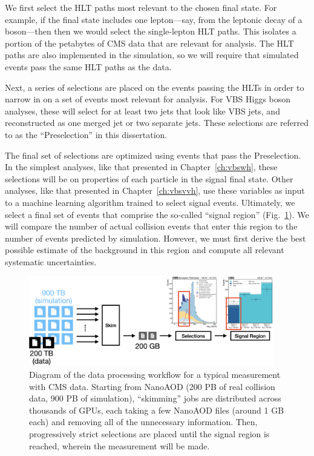 We first select the HLT paths most relevant to the chosen final state. 
For example, if the final state includes one lepton---say, from the leptonic decay of a \PW boson---then then we would select the single-lepton HLT paths. 
This isolates a portion of the petabytes of CMS data that are relevant for analysis. 
The HLT paths are also implemented in the simulation, so we will require that simulated events pass the same HLT paths as the data. 

Next, a series of selections are placed on the events passing the HLTs in order to narrow in on a set of events most relevant for analysis. 
For VBS Higgs boson analyses, these will select for at least two jets that look like VBS jets, and \Htobb reconstructed as one merged jet or two separate jets. 
These selections are referred to as the ``Preselection'' in this dissertation. 

The final set of selections are optimized using events that pass the Preselection. 
In the simplest analyses, like that presented in Chapter~\ref{ch:vbswh}, these selections will be on properties of each particle in the signal final state. 
Other analyses, like that presented in Chapter~\ref{ch:vbsvvh}, use these variables as input to a machine learning algorithm trained to select signal events. 
Ultimately, we select a final set of events that comprise the so-called ``signal region'' (Fig.~\ref{fig:nano_to_SR}). 
We will compare the number of actual collision events that enter this region to the number of events predicted by simulation. 
However, we must first derive the best possible estimate of the background in this region and compute all relevant systematic uncertainties. 

\begin{figure}[htb]
    \centering
    \includegraphics[width=0.95\textwidth]{fig/cms/nano_to_SR.png}
    \caption[Diagram of the data processing workflow for a typical measurement with CMS data.]{
        Diagram of the data processing workflow for a typical measurement with CMS data. 
        Starting from NanoAOD (200 PB of real collision data, 900 PB of simulation), ``skimming'' jobs are distributed across thousands of GPUs, each taking a few NanoAOD files (around 1 GB each) and removing all of the unnecessary information. 
        Then, progressively strict selections are placed until the signal region is reached, wherein the measurement will be made. 
    }
    \label{fig:nano_to_SR}
\end{figure}

